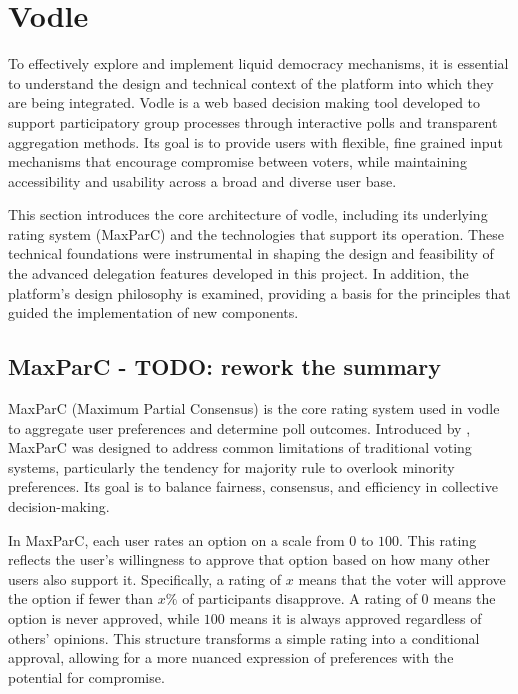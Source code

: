 \section{Vodle}
To effectively explore and implement liquid democracy mechanisms, it is essential to understand the design and technical context of the platform into which they are being integrated. Vodle is a web based decision making tool developed to support participatory group processes through interactive polls and transparent aggregation methods. Its goal is to provide users with flexible, fine grained input mechanisms that encourage compromise between voters, while maintaining accessibility and usability across a broad and diverse user base.

This section introduces the core architecture of vodle, including its underlying rating system (MaxParC) and the technologies that support its operation. These technical foundations were instrumental in shaping the design and feasibility of the advanced delegation features developed in this project. In addition, the platform's design philosophy is examined, providing a basis for the principles that guided the implementation of new components.


\subsection{MaxParC - TODO: rework the summary}
MaxParC (Maximum Partial Consensus) is the core rating system used in vodle to aggregate user preferences and determine poll outcomes. Introduced by \citet{heitzig_fair_2024}, MaxParC was designed to address common limitations of traditional voting systems, particularly the tendency for majority rule to overlook minority preferences. Its goal is to balance fairness, consensus, and efficiency in collective decision-making.

In MaxParC, each user rates an option on a scale from $0$ to $100$. This rating reflects the user's willingness to approve that option based on how many other users also support it. Specifically, a rating of $x$ means that the voter will approve the option if fewer than $x\%$ of participants disapprove. A rating of $0$ means the option is never approved, while $100$ means it is always approved regardless of others' opinions. This structure transforms a simple rating into a conditional approval, allowing for a more nuanced expression of preferences with the potential for compromise.

